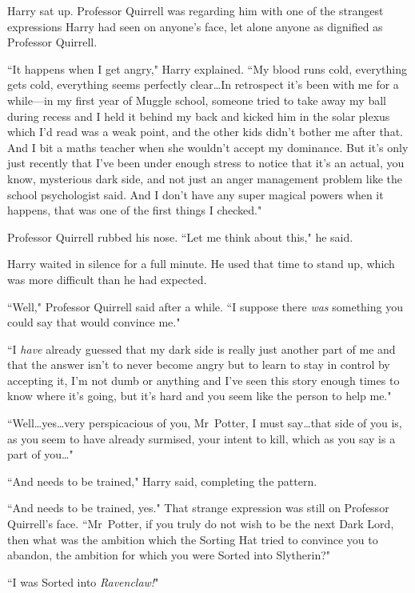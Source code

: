 Harry sat up. Professor Quirrell was regarding him with one of the strangest expressions Harry had seen on anyone's face, let alone anyone as dignified as Professor Quirrell.

``It happens when I get angry," Harry explained. ``My blood runs cold, everything gets cold, everything seems perfectly clear…In retrospect it's been with me for a while—in my first year of Muggle school, someone tried to take away my ball during recess and I held it behind my back and kicked him in the solar plexus which I'd read was a weak point, and the other kids didn't bother me after that. And I bit a maths teacher when she wouldn't accept my dominance. But it's only just recently that I've been under enough stress to notice that it's an actual, you know, mysterious dark side, and not just an anger management problem like the school psychologist said. And I don't have any super magical powers when it happens, that was one of the first things I checked."

Professor Quirrell rubbed his nose. ``Let me think about this," he said.

Harry waited in silence for a full minute. He used that time to stand up, which was more difficult than he had expected.

``Well," Professor Quirrell said after a while. ``I suppose there \emph{was} something you could say that would convince me."

``I \emph{have} already guessed that my dark side is really just another part of me and that the answer isn't to never become angry but to learn to stay in control by accepting it, I'm not dumb or anything and I've seen this story enough times to know where it's going, but it's hard and you seem like the person to help me."

``Well…yes…very perspicacious of you, Mr~Potter, I must say…that side of you is, as you seem to have already surmised, your intent to kill, which as you say is a part of you…"

``And needs to be trained," Harry said, completing the pattern.

``And needs to be trained, yes." That strange expression was still on Professor Quirrell's face. ``Mr~Potter, if you truly do not wish to be the next Dark Lord, then what was the ambition which the Sorting Hat tried to convince you to abandon, the ambition for which you were Sorted into Slytherin?"

``I was Sorted into \emph{Ravenclaw!}"

